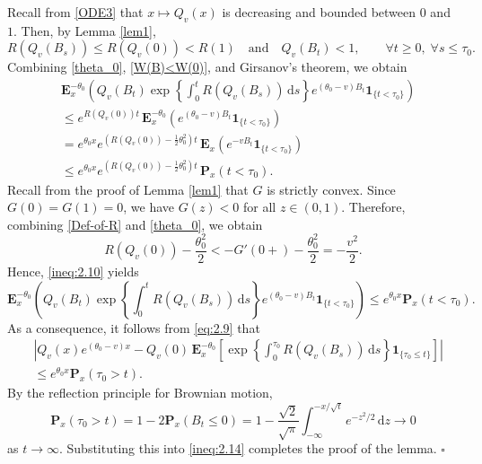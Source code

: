\documentclass[11pt]{article}
\numberwithin{equation}{section}
\def\proof{\noindent{\it Proof.~}}
\def\qed{\hfill$\square$\smallskip}
\begin{document}
\proof
Recall from \eqref{ODE3} that $x \mapsto Q_v(x)$ is decreasing and bounded between $0$ and $1$.
Then, by Lemma \ref{lem1},
\begin{equation}\label{W(B)<W(0)}
	R(Q_v(B_s)) \le R(Q_v(0)) < R(1) 
	\quad \text{and} \quad 
	Q_v(B_t) < 1, \qquad \forall t \ge 0, \; \forall s \le \tau_0.
\end{equation}
Combining \eqref{theta_0}, \eqref{W(B)<W(0)}, and Girsanov's theorem, we obtain
\begin{align}\label{ineq:2.10}
	& \mathbf E^{-\theta_0}_x
	\left( Q_v(B_t) \exp\left\{ \int_0^{t} R(Q_v(B_s)) \, \mathrm{d}s \right\} e^{(\theta_0 - v) B_t} \mathbf{1}_{\{t < \tau_0\}} \right) \nonumber \\
	&\le e^{R(Q_v(0)) t} \, \mathbf E^{-\theta_0}_x
	\left( e^{(\theta_0 - v) B_t} \mathbf{1}_{\{t < \tau_0\}} \right) \nonumber \\
	&=
	e^{\theta_0x}
	e^{(R(Q_v(0)) - \frac{1}{2}\theta_0^2) t} \, \mathbf E_x
	\left( e^{-v B_t} \mathbf{1}_{\{t < \tau_0\}} \right) \nonumber \\
	&\le 
	e^{\theta_0x}
	e^{(R(Q_v(0)) - \frac{1}{2}\theta_0^2) t} \, \mathbf P_x(t < \tau_0).
\end{align}
Recall from the proof of Lemma \ref{lem1} that $G$ is strictly convex. Since $G(0) = G(1) = 0$, we have $G(z) < 0$ for all $z \in (0,1)$. Therefore, combining \eqref{Def-of-R} and \eqref{theta_0}, we obtain
\begin{equation}\label{ineq:2.13}
	R(Q_v(0)) - \frac{\theta_0^2}{2} < -G'(0+) - \frac{\theta_0^2}{2} = -\frac{v^2}{2}.
\end{equation}
Hence, \eqref{ineq:2.10} yields
\begin{equation*}
	\mathbf E^{-\theta_0}_x
	\left( Q_v(B_t) \exp\left\{ \int_0^{t} R(Q_v(B_s)) \, \mathrm{d}s \right\} e^{(\theta_0 - v) B_t} \mathbf{1}_{\{t < \tau_0\}} \right)
	\leq 
	e^{\theta_0x}
	\mathbf P_x(t < \tau_0).
\end{equation*}
As a consequence, it follows from \eqref{eq:2.9} that
\begin{align}\label{ineq:2.14}
	& \left| Q_v(x) e^{(\theta_0 - v)x} - Q_v(0) \, \mathbf E^{-\theta_0}_x \left[ \exp\left\{ \int_0^{\tau_0} R(Q_v(B_s)) \, \mathrm{d}s \right\} \mathbf{1}_{\{\tau_0 \leq t\}} \right] \right| \nonumber\\
	&
	\leq 
	e^{\theta_0x}
	\mathbf P_x(\tau_0 > t).
\end{align}
By the reflection principle for Brownian motion,
\[
\mathbf P_x(\tau_0 > t) = 1 - 2 \mathbf P_x(B_t \leq 0)
= 1 - \frac{\sqrt{2}}{\sqrt{\pi}} \int_{-\infty}^{-x/\sqrt{t}} e^{-z^2/2} \, \mathrm{d}z
\to 0
\]
as $t \to \infty$. Substituting this into \eqref{ineq:2.14} completes the proof of the lemma.
\qed
\end{document}
